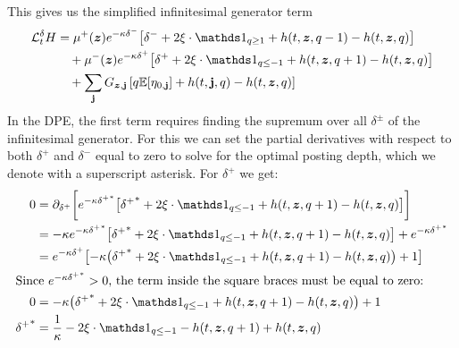 This gives us the simplified infinitesimal generator term
\begin{equation}
\begin{split}
\cL^{\delta}_t H & = \mu^+(\bz) e^{ -\kappa \delta^{-}} \bigl[ \delta^- + 2 \xi \cdot \indicator_{q \geq 1} + h(t,\bz,q-1) - h(t,\bz,q) \bigr] \\
& \quad + \mu^-(\bz) e^{ -\kappa \delta^{+}} \bigl[ \delta^+ + 2 \xi \cdot \indicator_{q \leq -1} + h(t,\bz,q+1) - h(t,\bz,q) \bigr] \\
& \quad + \sum_{\bj} G_{\bz,\bj} \left[q \E [\eta_{0,\bj}] +h(t,\bj,q) - h(t,\bz, q) \right]
\end{split}
\end{equation}
In the DPE, the first term requires finding the supremum over all $\delta^\pm$ of the infinitesimal generator. For this we can set the partial derivatives with respect to both $\delta^+$ and $\delta^-$ equal to zero to solve for the optimal posting depth, which we denote with a superscript asterisk. For $\delta^+$ we get:
\begin{align}
0 & = \partial_{\delta^+} \biggl[ e^{ -\kappa {\delta^+}^*} \bigl[ {\delta^+}^* +  2 \xi \cdot \indicator_{q \leq -1} + h(t,\bz,q+1) - h(t,\bz,q) \bigr] \biggr] \\
& = -\kappa e^{ -\kappa {\delta^+}^*} \bigl[ {\delta^+}^* +2 \xi \cdot \indicator_{q \leq -1} + h(t,\bz,q+1) - h(t,\bz,q) \bigr] + e^{ -\kappa {\delta^+}^*} \\
& = e^{ -\kappa \delta^{+}} \bigl[ -\kappa \bigl( {\delta^+}^* +2 \xi \cdot \indicator_{q \leq -1} + h(t,\bz,q+1) - h(t,\bz,q) \bigr) + 1 \bigr] \\
\intertext{Since $e^{ -\kappa {\delta^+}^*}>0$, the term inside the square braces must be equal to zero:}
0 & = -\kappa \bigl( {\delta^+}^* +2 \xi \cdot \indicator_{q \leq -1} + h(t,\bz,q+1) - h(t,\bz,q) \bigr) + 1 \\
{\delta^+}^* & = \frac{1}{\kappa} - 2 \xi \cdot \indicator_{q \leq -1} - h(t,\bz,q+1) + h(t,\bz,q) 
\end{align}

